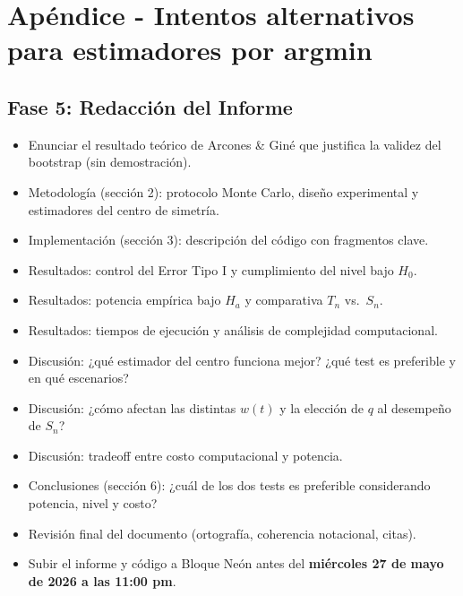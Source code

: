 \documentclass[11pt]{article}
\begin{document}
\newpage
\section{Apéndice - Intentos alternativos para estimadores por argmin}


\newpage




\subsection*{Fase 5: Redacción del Informe}
\begin{itemize}
    \item[\textbf{[$\checkmark$]}] Enunciar el resultado teórico de Arcones \& Giné que justifica la validez del bootstrap (sin demostración).
    \item[\textbf{[$\checkmark$]}] Metodología (sección 2): protocolo Monte Carlo, diseño experimental y estimadores del centro de simetría.
    \item[\textbf{[$\checkmark$]}] Implementación (sección 3): descripción del código con fragmentos clave.
    \item[\textbf{[ ]}] Resultados: control del Error Tipo I y cumplimiento del nivel bajo $H_0$.
    \item[\textbf{[ ]}] Resultados: potencia empírica bajo $H_a$ y comparativa $T_n$ vs.\ $S_n$.
    \item[\textbf{[ ]}] Resultados: tiempos de ejecución y análisis de complejidad computacional.
    \item[\textbf{[$\checkmark$ ]}] Discusión: ¿qué estimador del centro funciona mejor? ¿qué test es preferible y en qué escenarios?
    \item[\textbf{[$\checkmark$]}] Discusión: ¿cómo afectan las distintas $w(t)$ y la elección de $q$ al desempeño de $S_n$?
    \item[\textbf{[ ]}] Discusión: tradeoff entre costo computacional y potencia.
    \item[\textbf{[ ]}] Conclusiones (sección 6): ¿cuál de los dos tests es preferible considerando potencia, nivel y costo?
    \item[\textbf{[ ]}] Revisión final del documento (ortografía, coherencia notacional, citas).
    \item[\textbf{[ ]}] Subir el informe y código a Bloque Neón antes del \textbf{miércoles 27 de mayo de 2026 a las 11:00 pm}.
\end{itemize}
\end{document}

